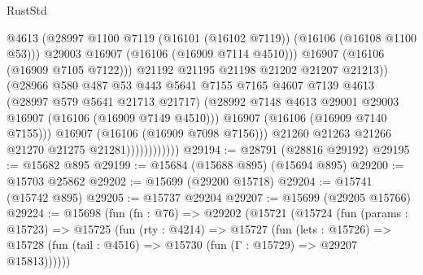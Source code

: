 \begin{lexlean}{RustStd}
\begin{coremodule}
                                      @4613
                                      (@28997
                                        @1100
                                        @7119
                                        (@16101 (@16102 @7119))
                                        (@16106 (@16108 @1100 @53)))
                                      @29003
                                      @16907
                                      (@16106 (@16909 @7114 @4510)))
                                    @16907
                                    (@16106 (@16909 @7105 @7122)))
                                  @21192
                                  @21195
                                  @21198
                                  @21202
                                  @21207
                                  @21213))
                              (@28966
                                @580
                                @487
                                @53
                                @443
                                @5641
                                @7155
                                @7165
                                @4607
                                @7139
                                @4613
                                (@28997 @579 @5641 @21713 @21717)
                                (@28992
                                  @7148
                                  @4613
                                  @29001
                                  @29003
                                  @16907
                                  (@16106 (@16909 @7149 @4510)))
                                @16907
                                (@16106 (@16909 @7140 @7155)))
                              @16907
                              (@16106 (@16909 @7098 @7156)))
                            @21260
                            @21263
                            @21266
                            @21270
                            @21275
                            @21281))))))))))))
@29194 := @28791 (@28816 @29192)
@29195 := @15682 @895
@29199 := @15684 (@15688 @895) (@15694 @895)
@29200 := @15703 @25862
@29202 := @15699 (@29200 @15718)
@29204 := @15741 (@15742 @895)
@29205 := @15737 @29204
@29207 := @15699 (@29205 @15766)
@29224 := @15698
    (fun (fn : @76) =>
    @29202
      (@15721
        (@15724
          (fun (params : @15723) =>
          @15725
            (fun (rty : @4214) =>
            @15727
              (fun (lets : @15726) =>
              @15728 (fun (tail : @4516) => @15730 (fun (Γ : @15729) => @29207 @15813))))))

\end{coremodule}
\end{lexlean}
